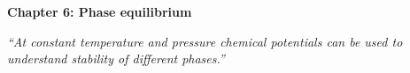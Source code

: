 \renewcommand{\theequation}{6.\arabic{equation}}

\begin{frame}
\begin{center}
{\bf Chapter 6: Phase equilibrium}\\
\end{center}

\scriptsize

\vspace*{3cm}

\begin{center}
\textit{``At constant temperature and pressure chemical potentials can be used to understand stability of different phases.''}
\end{center}

\end{frame}

\scriptsize









